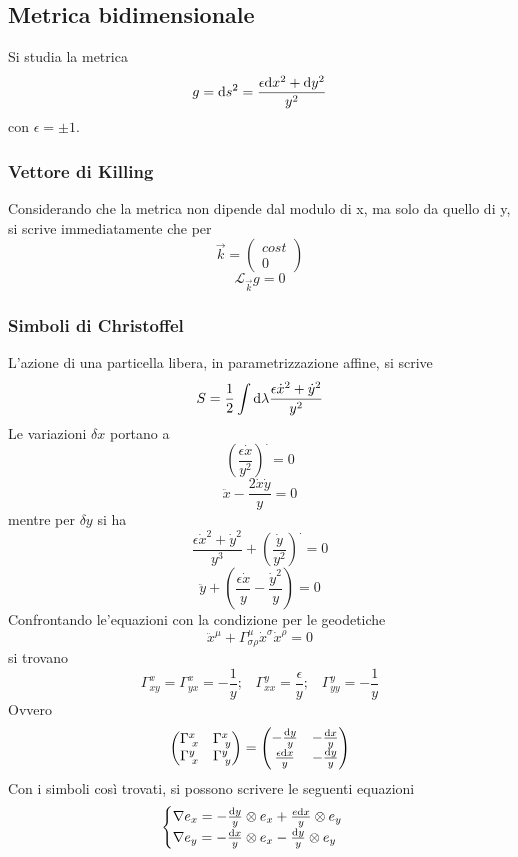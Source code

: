 \subsection{Metrica bidimensionale}
Si studia la metrica
\[ g = \mathrm{d} s^2 = \frac{\epsilon \mathrm{d} x^2 + \mathrm{d} y^2}{y^2} \]
con \( \epsilon = \pm 1\).

\subsubsection*{Vettore di Killing} \todo
Considerando che la metrica non dipende dal modulo di x, ma solo da quello di y, si scrive immediatamente che per 
\[ \vec{k} = \left( \begin{array}{c}  cost \\ 0 \end{array}  \right) \]
\[ \mathcal{L}_{\vec{k}} g = 0 \]

\subsubsection*{Simboli di Christoffel}
L'azione di una particella libera, in parametrizzazione affine, si scrive
\[ S = \frac{1}{2} \int \mathrm{d} \lambda \frac{\epsilon \dot{x}^2 + \dot{y}^2}{y^2} \]
Le variazioni $\delta x$ portano a 
\[ \left(\frac{\epsilon \dot{x}}{y^2}\right)^\cdot = 0 \]
\[ \ddot{x} - \frac{2\dot{x}\dot{y}}{y} = 0 \]
mentre per $\delta y$ si ha
\[ \frac{\epsilon \dot{x}^2 + \dot{y}^2}{y^3} + \left(\frac{\dot{y}}{y^2}\right)^\cdot =0 \]
\[ \ddot{y} + \left(\frac{\epsilon \dot{x}}{y} - \frac{\dot{y}^2}{y} \right) =0 \]
Confrontando le'equazioni con la condizione per le geodetiche
\[ \ddot{x}^\mu + \Gamma^\mu_{\sigma\rho} \dot{x}^\sigma\dot{x}^\rho =0 \]
si trovano
\[ \Gamma^x_{xy} = \Gamma^x_{yx} = -\frac{1}{y} ; \;\;\; \Gamma^y_{xx} = \frac{\epsilon}{y} ; \;\;\; \Gamma^y_{yy} = - \frac{1}{y} \]
Ovvero
\begin{equation}
	\begin{pmatrix}
		\Gamma^x_{\; x} & \Gamma^x_{\; y} \\
		\Gamma^y_{\; x} & \Gamma^y_{\; y} 
	\end{pmatrix} = 
	\begin{pmatrix}
		-\frac{\mathrm{d} y}{y} 	& -\frac{\mathrm{d} x}{y}  \\
		\frac{\epsilon\mathrm{d} x}{y} & -\frac{\mathrm{d} y}{y} 
	\end{pmatrix}
\end{equation}
Con i simboli cos\`i trovati, si possono scrivere le seguenti equazioni
\begin{equation} 
	\begin{cases}
		\nabla e_x = -\frac{\mathrm{d} y}{y} \otimes e_x + \frac{e \mathrm{d} x}{y} \otimes e_y & \\ 
		\nabla e_y = -\frac{\mathrm{d} x}{y} \otimes e_x - \frac{\mathrm{d} y}{y} \otimes e_y & \\
	\end{cases}
\end{equation}


